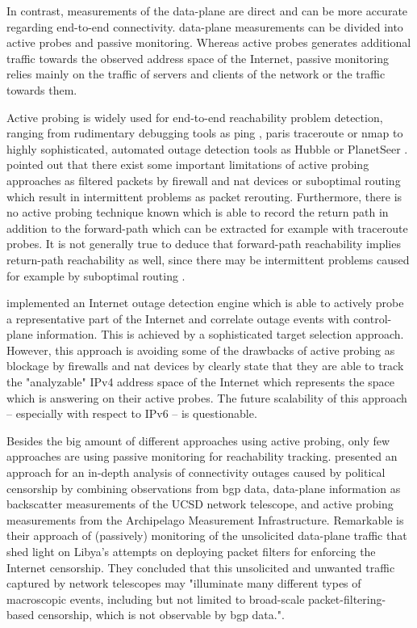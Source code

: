 In contrast, measurements of the \gls{data-plane} are direct and can be more accurate regarding end-to-end connectivity. 
\Gls{data-plane} measurements can be divided into active probes and passive monitoring. 
Whereas active probes generates additional traffic towards the observed address space of the Internet, passive monitoring relies mainly on the traffic of servers and clients of the network or the traffic towards them. 

Active probing is widely used for end-to-end reachability problem detection, ranging from rudimentary debugging tools as ping \citep{PING}, paris traceroute \citep{traceroute} or nmap \citep{Nmap} to highly sophisticated, automated
outage detection tools as Hubble \citep{Katz:2008} or PlanetSeer \citep{Zhang:2004}. 
\citet{Bush:Optometry} pointed out that there exist some important limitations of active probing approaches as filtered packets by firewall and \gls{nat} devices or suboptimal routing which result in intermittent problems as packet rerouting.
Furthermore, there is no active probing technique known which is able to record the return path in addition to the forward-path which can be extracted for example with traceroute probes. 
It is not generally true to deduce that forward-path reachability implies return-path reachability as well, since there may be intermittent problems caused for example by suboptimal routing \citep{Bush:Optometry}.

\citet{Quan12a} implemented an Internet outage detection engine which is able to actively probe a representative part of the Internet and correlate outage events with \gls{control-plane} information. 
This is achieved by a sophisticated target selection approach. 
However, this approach is avoiding some of the drawbacks of active probing as blockage by firewalls and \gls{nat} devices by clearly state that they are able to track the "analyzable" \gls{IPv4} address space of the Internet which represents the space which is answering on their active probes.
The future scalability of this approach -- especially with respect to \gls{IPv6} -- is questionable. 

Besides the big amount of different approaches using active probing, only few approaches are using passive monitoring for reachability tracking. 
\citet{Dainotti:2011:ACI} presented an approach for an in-depth analysis of connectivity outages caused by political censorship by combining observations from \gls{bgp} data, \gls{data-plane} information as backscatter measurements of the UCSD network telescope, and active probing measurements from the Archipelago Measurement Infrastructure. 
Remarkable is their approach of (passively) monitoring of the unsolicited \gls{data-plane} traffic that shed light on Libya's attempts on deploying packet filters for enforcing the Internet censorship. 
They concluded that this unsolicited and unwanted traffic captured by network telescopes may "illuminate many different types of macroscopic events, including but not limited to broad-scale packet-filtering-based censorship, which is not observable by \gls{bgp} data."\citep{Dainotti:2011:ACI}.

